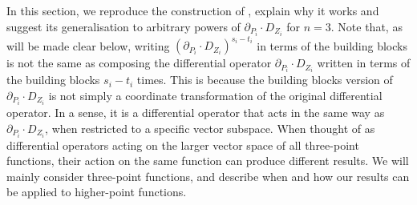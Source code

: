 \documentclass[12pt,a4paper]{extarticle}
\theoremstyle{definition}
\begin{document}
\medskip

In this section, we reproduce the construction of \cite{Zhiboedov}, explain why it works and suggest its generalisation to arbitrary powers of $\partial_{P_i}\cdot D_{Z_i}$ for $n=3$. 
Note that, as will be made clear below, writing $(\partial_{P_i}\cdot D_{Z_i})^{s_i-t_i}$ in terms of the building blocks is not the same as composing the differential operator $\partial_{P_i}\cdot D_{Z_i}$ written in terms of the building blocks $s_i-t_i$ times. 
This is because the building blocks version of $\partial_{P_i}\cdot D_{Z_i}$ is not simply a coordinate transformation of the original differential operator.
In a sense, it is a differential operator that acts in the same way as $\partial_{P_i}\cdot D_{Z_i}$, when restricted to a specific vector subspace. When thought of as differential operators acting on the larger vector space of all three-point functions, their action on the same function can produce different results.
We will mainly consider three-point functions, and describe when and how our results can be applied to higher-point functions. 

\medskip
\end{document}

